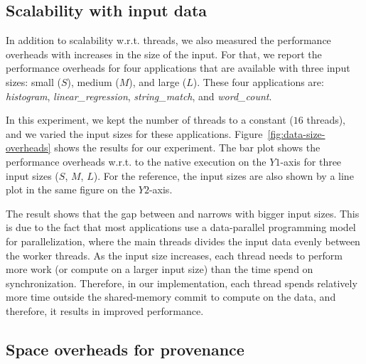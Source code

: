 \subsection{Scalability with input data}
\label{subsec:data-sizes-overheads}


 In addition to scalability w.r.t.  threads, we also measured the performance overheads with increases in the size of the input.  For that, we
report the performance overheads for four applications that are available with
three input sizes: small ($S$), medium ($M$), and large ($L$). These four applications are: {\em histogram}, {\em linear\_regression}, {\em string\_match}, and {\em word\_count}.

In this experiment, we kept the number of threads to a constant  ($16$ threads), and we varied the input sizes for these applications.  Figure~\ref{fig:data-size-overheads} shows the results for our experiment. The bar plot shows the performance overheads w.r.t. to the native \pthreads execution on the $Y1$-axis for three input sizes ($S$, $M$, $L$). For the reference, the input sizes are also shown by a line plot in the same figure on the $Y2$-axis. 

The result shows that the gap between \pthreads and \projecttitle narrows with bigger input sizes. This is due to the fact that most applications use a data-parallel programming model for parallelization, where the main threads divides the input data evenly between the worker threads. As the input size increases, each thread needs to perform more work (or compute on a larger input size) than the time spend on synchronization. Therefore, in our implementation, each thread spends relatively more time outside the shared-memory commit to compute on the data, and therefore, it results in improved performance.
 

%











\subsection{Space overheads for provenance}
\label{subsec:overheads-breakdown}

